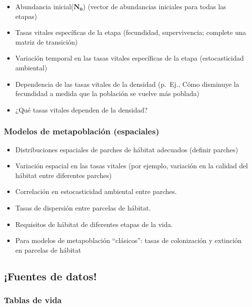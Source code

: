 \documentclass[
]{article}
\providecommand{\tightlist}{%
  \setlength{\itemsep}{0pt}\setlength{\parskip}{0pt}}
\begin{document}
\begin{itemize}
\tightlist
\item
  Abundancia inicial(\(\mathbf{N_0}\)) (vector de abundancias iniciales
  para todas las etapas)
\item
  Tasas vitales específicas de la etapa (fecundidad, supervivencia;
  complete una matriz de transición)
\item
  Variación temporal en las tasas vitales específicas de la etapa
  (estocasticidad ambiental)
\item
  Dependencia de las tasas vitales de la densidad (p.~Ej., Cómo
  disminuye la fecundidad a medida que la población se vuelve más
  poblada)
\item
  ¿Qué tasas vitales dependen de la densidad?
\end{itemize}

\hypertarget{modelos-de-metapoblaciuxf3n-espaciales}{%
\subsubsection{Modelos de metapoblación
(espaciales)}\label{modelos-de-metapoblaciuxf3n-espaciales}}

\begin{itemize}
\tightlist
\item
  Distribuciones espaciales de parches de hábitat adecuados (definir
  parches)
\item
  Variación espacial en las tasas vitales (por ejemplo, variación en la
  calidad del hábitat entre diferentes parches)
\item
  Correlación en estocasticidad ambiental entre parches.
\item
  Tasas de dispersión entre parcelas de hábitat.
\item
  Requisitos de hábitat de diferentes etapas de la vida.
\item
  Para modelos de metapoblación ``clásicos'': tasas de colonización y
  extinción en parcelas de hábitat
\end{itemize}

\hypertarget{fuentes-de-datos}{%
\subsection{¡Fuentes de datos!}\label{fuentes-de-datos}}

\hypertarget{tablas-de-vida}{%
\subsubsection{Tablas de vida}\label{tablas-de-vida}}
\end{document}

